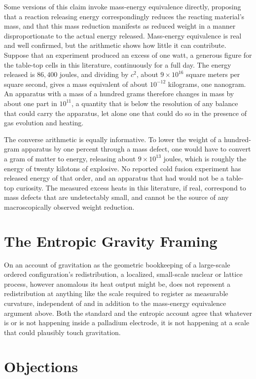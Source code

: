 \documentclass[11pt]{article}
\begin{document}
Some versions of this claim invoke mass-energy equivalence directly, proposing that a reaction releasing energy correspondingly reduces the reacting material's mass, and that this mass reduction manifests as reduced weight in a manner disproportionate to the actual energy released. Mass-energy equivalence is real and well confirmed, but the arithmetic shows how little it can contribute. Suppose that an experiment produced an excess of one watt, a generous figure for the table-top cells in this literature, continuously for a full day. The energy released is $86{,}400$ joules, and dividing by $c^2$, about $9\times10^{16}$ square meters per square second, gives a mass equivalent of about $10^{-12}$ kilograms, one nanogram. An apparatus with a mass of a hundred grams therefore changes in mass by about one part in $10^{11}$, a quantity that is below the resolution of any balance that could carry the apparatus, let alone one that could do so in the presence of gas evolution and heating.

The converse arithmetic is equally informative. To lower the weight of a hundred-gram apparatus by one percent through a mass defect, one would have to convert a gram of matter to energy, releasing about $9\times10^{13}$ joules, which is roughly the energy of twenty kilotons of explosive. No reported cold fusion experiment has released energy of that order, and an apparatus that had would not be a table-top curiosity. The measured excess heats in this literature, if real, correspond to mass defects that are undetectably small, and cannot be the source of any macroscopically observed weight reduction.

\section{The Entropic Gravity Framing}

On an account of gravitation as the geometric bookkeeping of a large-scale ordered configuration's redistribution, a localized, small-scale nuclear or lattice process, however anomalous its heat output might be, does not represent a redistribution at anything like the scale required to register as measurable curvature, independent of and in addition to the mass-energy equivalence argument above. Both the standard and the entropic account agree that whatever is or is not happening inside a palladium electrode, it is not happening at a scale that could plausibly touch gravitation.

\section{Objections}
\end{document}
